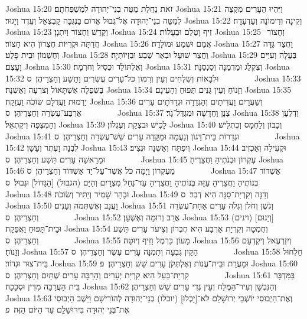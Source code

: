 Joshua 15:20	זֹאת נַחֲלַת מַטֵּה בְנֵי־יְהוּדָה לְמִשְׁפְּחֹתָם׃
Joshua 15:21	וַיִּהְיוּ הֶעָרִים מִקְצֵה לְמַטֵּה בְנֵי־יְהוּדָה אֶל־גְּבוּל אֱדוֹם בַּנֶּגְבָּה קַבְצְאֵל וְעֵדֶר וְיָגוּר׃
Joshua 15:22	וְקִינָה וְדִימוֹנָה וְעַדְעָדָה׃
Joshua 15:23	וְקֶדֶשׁ וְחָצוֹר וְיִתְנָן׃
Joshua 15:24	זִיף וָטֶלֶם וּבְעָלוֹת׃
Joshua 15:25	וְחָצוֹר  חֲדַתָּה וּקְרִיּוֹת חֶצְרוֹן הִיא חָצוֹר׃
Joshua 15:26	אֲמָם וּשְׁמַע וּמוֹלָדָה׃
Joshua 15:27	וַחֲצַר גַּדָּה וְחֶשְׁמוֹן וּבֵית פָּלֶט׃
Joshua 15:28	וַחֲצַר שׁוּעָל וּבְאֵר שֶׁבַע וּבִזְיוֹתְיָה׃
Joshua 15:29	בַּעֲלָה וְעִיִּים וָעָצֶם׃
Joshua 15:30	וְאֶלְתּוֹלַד וּכְסִיל וְחרְמָה׃
Joshua 15:31	וְצִקְלַג וּמַדְמַנָּה וְסַנְסַנָּה׃
Joshua 15:32	וּלְבָאוֹת וְשִׁלְחִים וְעַיִן וְרִמּוֹן כּל־עָרִים עֶשְׂרִים וָתֵשַׁע וְחַצְרֵיהֶן׃ {ס}        
Joshua 15:33	בַּשְּׁפֵלָה אֶשְׁתָּאוֹל וְצרְעָה וְאַשְׁנָה׃
Joshua 15:34	וְזָנוֹחַ וְעֵין גַּנִּים תַּפּוּחַ וְהָעֵינָם׃
Joshua 15:35	יַרְמוּת וַעֲדֻלָּם שׂוֹכֹה וַעֲזֵקָה׃
Joshua 15:36	וְשַׁעֲרַיִם וַעֲדִיתַיִם וְהַגְּדֵרָה וּגְדֵרֹתָיִם עָרִים אַרְבַּע־עֶשְׂרֵה וְחַצְרֵיהֶן׃ {ס}        
Joshua 15:37	צְנָן וַחֲדָשָׁה וּמִגְדַּל־גָּד׃
Joshua 15:38	וְדִלְעָן וְהַמִּצְפֶּה וְיקְתְאֵל׃
Joshua 15:39	לָכִישׁ וּבצְקַת וְעֶגְלוֹן׃
Joshua 15:40	וְכַבּוֹן וְלַחְמָס וְכִתְלִישׁ׃
Joshua 15:41	וּגְדֵרוֹת בֵּית־דָּגוֹן וְנַעֲמָה וּמַקֵּדָה עָרִים שֵׁשׁ־עֶשְׂרֵה וְחַצְרֵיהֶן׃ {ס}        
Joshua 15:42	לִבְנָה וָעֶתֶר וְעָשָׁן׃
Joshua 15:43	וְיִפְתָּח וְאַשְׁנָה וּנְצִיב׃
Joshua 15:44	וּקְעִילָה וְאַכְזִיב וּמָרֵאשָׁה עָרִים תֵּשַׁע וְחַצְרֵיהֶן׃ {ס}        
Joshua 15:45	עֶקְרוֹן וּבְנֹתֶיהָ וַחֲצֵרֶיהָ׃
Joshua 15:46	מֵעֶקְרוֹן וָיָמָּה כֹּל אֲשֶׁר־עַל־יַד אַשְׁדּוֹד וְחַצְרֵיהֶן׃ {ס}        
Joshua 15:47	אַשְׁדּוֹד בְּנוֹתֶיהָ וַחֲצֵרֶיהָ עַזָּה בְּנוֹתֶיהָ וַחֲצֵרֶיהָ עַד־נַחַל מִצְרָיִם וְהַיָּם (הגבול) [הַגָּדוֹל] וּגְבוּל׃ {ס}        
Joshua 15:48	וּבָהָר שָׁמִיר וְיַתִּיר וְשׂוֹכֹה׃
Joshua 15:49	וְדַנָּה וְקִרְיַת־סַנָּה הִיא דְבִר׃ {ס}        
Joshua 15:50	וַעֲנָב וְאֶשְׁתְּמֹה וְעָנִים׃
Joshua 15:51	וְגֹשֶׁן וְחֹלֹן וְגִלֹה עָרִים אַחַת־עֶשְׂרֵה וְחַצְרֵיהֶן׃ {ס}        
Joshua 15:52	אֲרַב וְרוּמָה וְאֶשְׁעָן׃
Joshua 15:53	(וינים) [וְיָנוּם] וּבֵית־תַּפּוּחַ וַאֲפֵקָה׃
Joshua 15:54	וְחֻמְטָה וְקִרְיַת אַרְבַּע הִיא חֶבְרוֹן וְצִיעֹר עָרִים תֵּשַׁע וְחַצְרֵיהֶן׃ {ס}        
Joshua 15:55	מָעוֹן  כַּרְמֶל וָזִיף וְיוּטָּה׃
Joshua 15:56	וְיִזְרְעֶאל וְיקְדְעָם וְזָנוֹחַ׃
Joshua 15:57	הַקַּיִן גִּבְעָה וְתִמְנָה עָרִים עֶשֶׂר וְחַצְרֵיהֶן׃ {ס}        
Joshua 15:58	חַלְחוּל בֵּית־צוּר וּגְדוֹר׃
Joshua 15:59	וּמַעֲרָת וּבֵית־עֲנוֹת וְאֶלְתְּקֹן עָרִים שֵׁשׁ וְחַצְרֵיהֶן׃ {פ}
Joshua 15:60	קִרְיַת־בַּעַל הִיא קִרְיַת יְעָרִים וְהָרַבָּה עָרִים שְׁתַּיִם וְחַצְרֵיהֶן׃ {ס}        
Joshua 15:61	בַּמִּדְבָּר בֵּית הָעֲרָבָה מִדִּין וּסְכָכָה׃
Joshua 15:62	וְהַנִּבְשָׁן וְעִיר־הַמֶּלַח וְעֵין גֶּדִי עָרִים שֵׁשׁ וְחַצְרֵיהֶן׃
Joshua 15:63	וְאֶת־הַיְבוּסִי יוֹשְׁבֵי יְרוּשָׁלַ͏ִם לֹא־[יָכְלוּ] (יוכלו) בְנֵי־יְהוּדָה לְהוֹרִישָׁם וַיֵּשֶׁב הַיְבוּסִי אֶת־בְּנֵי יְהוּדָה בִּירוּשָׁלַ͏ִם עַד הַיּוֹם הַזֶּה׃ {פ}
